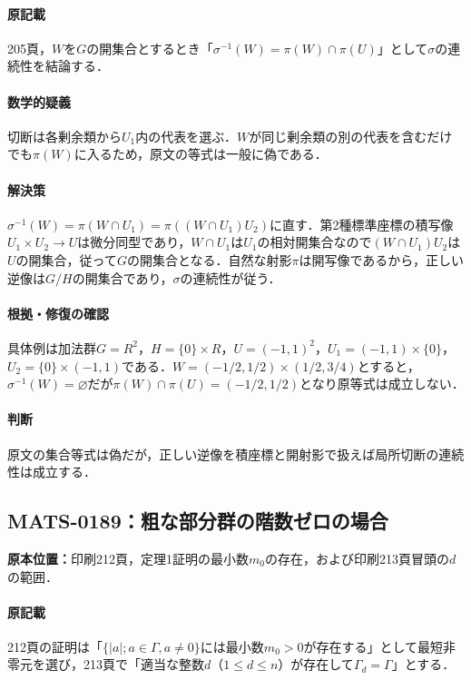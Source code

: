 \documentclass[a4paper,10pt]{ltjsarticle}
\begin{document}
\paragraph{原記載}205頁，$W$を$G$の開集合とするとき「$\sigma^{-1}(W)=\pi(W)\cap\pi(U)$」として$\sigma$の連続性を結論する．

\paragraph{数学的疑義}切断は各剰余類から$U_1$内の代表を選ぶ．$W$が同じ剰余類の別の代表を含むだけでも$\pi(W)$に入るため，原文の等式は一般に偽である．

\paragraph{解決策}$\sigma^{-1}(W)=\pi(W\cap U_1)=\pi((W\cap U_1)U_2)$に直す．第2種標準座標の積写像$U_1\times U_2\to U$は微分同型であり，$W\cap U_1$は$U_1$の相対開集合なので$(W\cap U_1)U_2$は$U$の開集合，従って$G$の開集合となる．自然な射影$\pi$は開写像であるから，正しい逆像は$G/H$の開集合であり，$\sigma$の連続性が従う．

\paragraph{根拠・修復の確認}具体例は加法群$G=R^2$，$H=\{0\}\times R$，$U=(-1,1)^2$，$U_1=(-1,1)\times\{0\}$，$U_2=\{0\}\times(-1,1)$である．$W=(-1/2,1/2)\times(1/2,3/4)$とすると，$\sigma^{-1}(W)=\varnothing$だが$\pi(W)\cap\pi(U)=(-1/2,1/2)$となり原等式は成立しない．

\paragraph{判断}原文の集合等式は偽だが，正しい逆像を積座標と開射影で扱えば局所切断の連続性は成立する．


\subsection*{MATS-0189：粗な部分群の階数ゼロの場合}\label{math:MATS-0189}
\noindent\textbf{原本位置：}印刷212頁，定理1証明の最小数$m_0$の存在，および印刷213頁冒頭の$d$の範囲．

\paragraph{原記載}212頁の証明は「$\{|a|;a\in\Gamma,a\ne0\}$には最小数$m_0>0$が存在する」として最短非零元を選び，213頁で「適当な整数$d$（$1\le d\le n$）が存在して$\Gamma_d=\Gamma$」とする．
\end{document}
